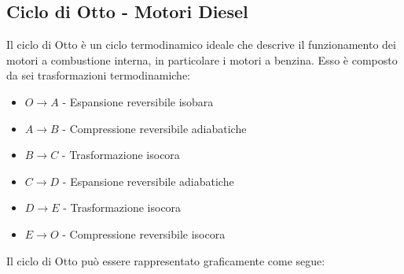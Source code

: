     \subsection{Ciclo di Otto - Motori Diesel} 
        Il ciclo di Otto è un ciclo termodinamico ideale che descrive il funzionamento dei motori a combustione interna, in particolare i motori a benzina. Esso è composto da sei trasformazioni termodinamiche:
        \begin{itemize}
            \item $O\to A$ - Espansione reversibile isobara
            \item $A\to B$ - Compressione reversibile adiabatiche
            \item $B\to C$ - Trasformazione isocora
            \item $C\to D$ - Espansione reversibile adiabatiche
            \item $D\to E$ - Trasformazione isocora
            \item $E \to O$ - Compressione reversibile isocora
        \end{itemize}
        Il ciclo di Otto può essere rappresentato graficamente come segue:
